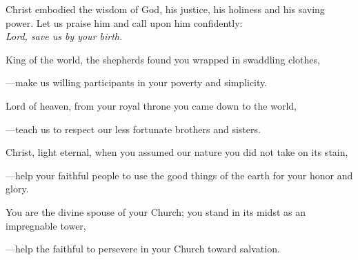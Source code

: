 \intercessions\indent

\begin{hangpar}

Christ embodied the wisdom of God, his justice, his holiness and his saving power. Let us praise him and call upon him confidently:\\
\emph{Lord, save us by your birth.}

\medskip King of the world, the shepherds found you wrapped in swaddling clothes,

{\color{red}---\thinspace}make us willing participants in your poverty and simplicity.

\medskip Lord of heaven, from your royal throne you came down to the world,

{\color{red}---\thinspace}teach us to respect our less fortunate brothers and sisters.

\medskip Christ, light eternal, when you assumed our nature you did not take on its stain,

{\color{red}---\thinspace}help your faithful people to use the good things of the earth for your honor and glory.

\medskip You are the divine spouse of your Church; you stand in its midst as an impregnable tower,

{\color{red}---\thinspace}help the faithful to persevere in your Church toward salvation.

\medskip

\end{hangpar}
